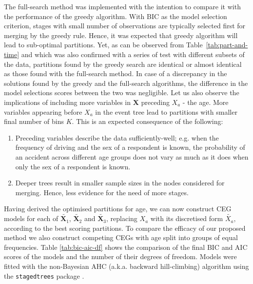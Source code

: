 \documentclass[runningheads]{llncs}
\begin{document}
The full-search method was implemented with the intention to compare it with the performance of the greedy algorithm. With BIC as the model selection criterion, stages with small number of observations are typically selected first for merging by the greedy rule. Hence, it was expected that greedy algorithm will lead to sub-optimal partitions. Yet, as can be observed from Table~\ref{tab:part-and-time} and which was also confirmed with a series of test with different subsets of the data, partitions found by the greedy search are identical or almost identical as those found with the full-search method. In case of a discrepancy in the solutions found by the greedy and the full-search algorithms, the difference in the model selections scores between the two  was negligible.
Let us also observe the implications of including more variables in $\boldsymbol{X}$ preceding $X_a$ - the age. More variables appearing before $X_a$ in the event tree lead to partitions with smaller final number of bins $K$. This is an expected consequence of the following:
\begin{enumerate}[topsep=0pt]
    \item Preceding variables describe the data sufficiently-well; e.g. when the frequency of driving and the sex of a respondent is known, the probability of an accident across different age groups does not vary as much as it does when only the sex of a respondent is known. 
    \item Deeper trees result in smaller sample sizes in the nodes considered for merging. Hence, less evidence for the need of more stages.    
\end{enumerate}
Having derived the optimised partitions for age, we can now construct CEG models for each of $\tilde{\boldsymbol{X}_1}$, $\tilde{\boldsymbol{X}_2}$ and $\tilde{\boldsymbol{X}_3}$, replacing $X_a$ with its discretised form $\tilde{X_a}$, according to the best scoring partitions. To compare the efficacy of our proposed method we also construct competing CEGs with age split into groups of equal frequencies. Table \ref{tab:bic-aic-df} shows the comparison of the final BIC and AIC scores of the models and the number of their degrees of freedom. Models were fitted with the non-Bayesian AHC (a.k.a. backward hill-climbing) algorithm using the \texttt{stagedtrees} package \cite{stagedtrees}.
\end{document}
